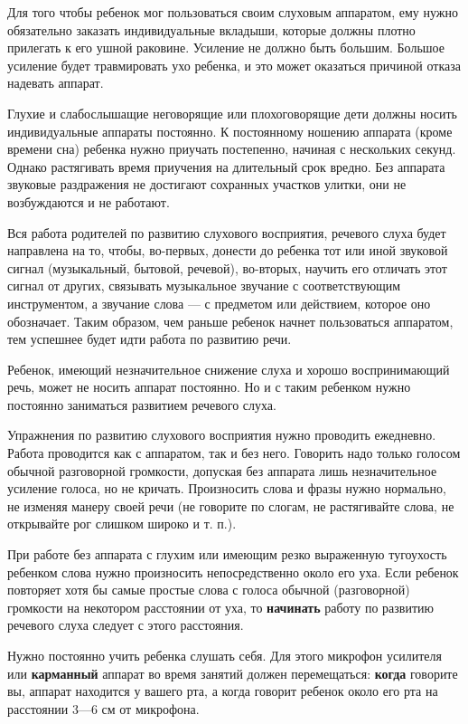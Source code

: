 \documentclass[a5paper]{book}
\begin{document}
Для того чтобы ребенок мог пользоваться своим слуховым аппаратом, ему
нужно обязательно заказать индивидуальные вкладыши, которые должны
плотно прилегать к его ушной раковине. Усиление не должно быть большим.
Большое усиление будет травмировать ухо ребенка, и это может оказаться
причиной отказа надевать аппарат.

Глухие и слабослышащие неговорящие или плохоговорящие дети должны носить
индивидуальные аппараты постоянно. К постоянному ношению аппарата (кроме
времени сна) ребенка нужно приучать постепенно, начиная с нескольких
секунд. Однако растягивать время приучения на длительный срок вредно.
Без аппарата звуковые раздражения не достигают сохранных участков
улитки, они не возбуждаются и не работают.

Вся работа родителей по развитию слухового восприятия, речевого слуха
будет направлена на то, чтобы, во-первых, донести до ребенка тот или
иной звуковой сигнал (музыкальный, бытовой, речевой), во-вторых, научить
его отличать этот сигнал от других, связывать музыкальное звучание с
соответствующим инструментом, а звучание слова --- с предметом или
действием, которое оно обозначает. Таким образом, чем раньше ребенок
начнет пользоваться аппаратом, тем успешнее будет идти работа по
развитию речи.

Ребенок, имеющий незначительное снижение слуха и хорошо воспринимающий
речь, может не носить аппарат постоянно. Но и с таким ребенком нужно
постоянно заниматься развитием речевого слуха.

Упражнения по развитию слухового восприятия нужно проводить ежедневно.
Работа проводится как с аппаратом, так и без него. Говорить надо только
голосом обычной разговорной громкости, допуская без аппарата лишь
незначительное усиление голоса, но не кричать. Произносить слова и фразы
нужно нормально, не изменяя манеру своей речи (не говорите по слогам, не
растягивайте слова, не открывайте рог слишком широко и т. п.).

При работе без аппарата с глухим или имеющим резко выраженную тугоухость
ребенком слова нужно произносить непосредственно около его уха. Если
ребенок повторяет хотя бы самые простые слова с голоса обычной
(разговорной) громкости на некотором расстоянии от уха, то
\textbf{начинать} работу по развитию речевого слуха следует с этого
расстояния.

Нужно постоянно учить ребенка слушать себя. Для этого микрофон усилителя
или \textbf{карманный} аппарат во время занятий должен перемещаться:
\textbf{когда} говорите вы, аппарат находится у вашего рта, а когда
говорит ребенок около его рта на расстоянии 3---6 см от микрофона.
\end{document}
